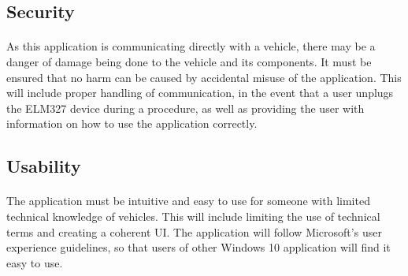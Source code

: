 	\subsection{Security}
		\paragraph{}{
		As this application is communicating directly with a vehicle, there may be a danger of damage being done to the vehicle and its components. It must be ensured that no harm can be caused by accidental misuse of the application. This will include proper handling of communication, in the event that a user unplugs the ELM327 device during a procedure, as well as providing the user with information on how to use the application correctly.
		}		
	\subsection{Usability}
		\paragraph{}{
		The application must be intuitive and easy to use for someone with limited technical knowledge of vehicles. This will include limiting the use of technical terms and creating a coherent UI. The application will follow Microsoft's user experience guidelines, so that users of other Windows 10 application will find it easy to use.
		}